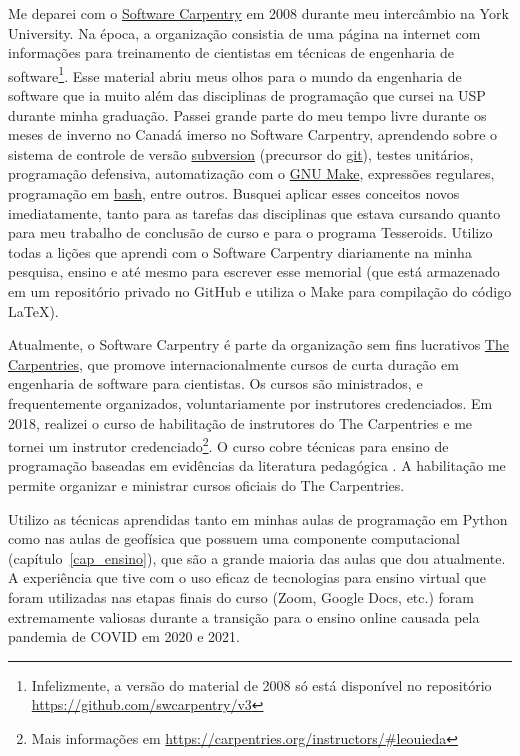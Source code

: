 \documentclass[10pt,a4paper,oneside]{book}
\begin{document}
Me deparei com o \href{https://software-carpentry.org/}{Software Carpentry}
em 2008 durante meu intercâmbio na York University.
Na época, a organização consistia de uma página na internet com informações
para treinamento de cientistas em técnicas de engenharia de
software\footnote{Infelizmente, a versão do material de 2008 só está disponível
no repositório \url{https://github.com/swcarpentry/v3}}.
Esse material abriu meus olhos para o mundo da engenharia de software que ia
muito além das disciplinas de programação que cursei na USP durante minha
graduação.
Passei grande parte do meu tempo livre durante os meses de inverno no Canadá
imerso no Software Carpentry, aprendendo sobre o sistema de controle de versão
\href{https://subversion.apache.org/}{subversion} (precursor do
\href{https://git-scm.com/}{git}), testes unitários, programação defensiva,
automatização com o \href{https://www.gnu.org/software/make/}{GNU Make},
expressões regulares, programação em
\href{https://www.gnu.org/software/bash/}{bash}, entre outros.
Busquei aplicar esses conceitos novos imediatamente, tanto para as tarefas das
disciplinas que estava cursando quanto para meu trabalho de conclusão de curso
e para o programa Tesseroids.
Utilizo todas a lições que aprendi com o Software Carpentry diariamente na
minha pesquisa, ensino e até mesmo para escrever esse memorial (que está
armazenado em um repositório privado no GitHub e utiliza o Make para compilação
do código \LaTeX{}).

Atualmente, o Software Carpentry é parte da organização sem fins lucrativos
\href{https://carpentries.org/}{The Carpentries}, que promove
internacionalmente cursos de curta duração em engenharia de software para
cientistas.
Os cursos são ministrados, e frequentemente organizados, voluntariamente por
instrutores credenciados.
Em 2018, realizei o curso de habilitação de instrutores do The Carpentries e me
tornei um instrutor
credenciado\footnote{Mais informações em \url{https://carpentries.org/instructors/\#leouieda}}.
O curso cobre técnicas para ensino de programação baseadas em evidências da
literatura pedagógica \citep[resumidas em][]{Brown2018}.
A habilitação me permite organizar e ministrar cursos oficiais do The
Carpentries.

Utilizo as técnicas aprendidas tanto em minhas aulas de programação em Python
como nas aulas de geofísica que possuem uma componente computacional
(capítulo~\ref{cap_ensino}), que são a grande maioria das aulas que dou
atualmente.
A experiência que tive com o uso eficaz de tecnologias para ensino virtual que
foram utilizadas nas etapas finais do curso (Zoom, Google Docs, etc.) foram
extremamente valiosas durante a transição para o ensino online causada pela
pandemia de COVID em 2020 e 2021.
\end{document}
